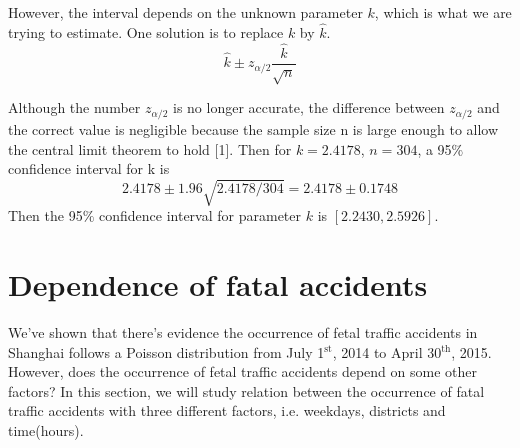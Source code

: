 \documentclass[a4paper,12pt]{article}
\begin{document}
\noindent However, the interval depends on the unknown parameter $ k$, which is what we are trying to estimate. One solution is to replace $k$ by $\widehat{k}$.
\begin{equation}
\widehat{k}\pm z_{\alpha/2}\frac{\widehat{k}}{\sqrt{n}}
\end{equation}

\noindent Although the number $z_{\alpha/2}$ is no longer accurate, the difference between  $z_{\alpha/2}$ and the correct value is negligible because the sample size n is large enough to allow the central limit theorem to hold [1]. Then for $k=2.4178$, $n=304$, a 95$\%$ confidence interval for k is
\begin{equation}
2.4178\pm 1.96\sqrt{2.4178/304}=2.4178\pm 0.1748
\end{equation}
Then the 95$\%$ confidence interval for parameter $k$ is $[2.2430,2.5926]$.
\section{Dependence of fatal accidents}
 \noindent We've shown that there's evidence the occurrence of fetal traffic accidents in Shanghai follows a Poisson distribution from July 1$^{\text{st}}$, 2014 to April 30$^{\text{th}}$, 2015. However, does the occurrence of fetal traffic accidents depend on some other factors? In this section, we will study relation between the occurrence of fatal traffic accidents with three different factors, i.e. weekdays, districts and time(hours).
\end{document}

